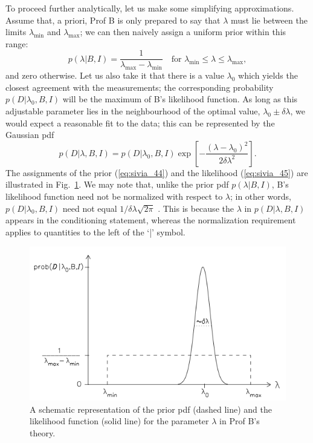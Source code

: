 \documentclass[%
oneside,                 %
final,                   %
10pt]{article}
\begin{document}
To proceed further analytically, let us make some simplifying approximations. Assume that, a priori, Prof B is only prepared to say that $\lambda$ must lie between the limits $\lambda_\mathrm{min}$ and $\lambda_\mathrm{max}$; we can then naively assign a uniform prior within this range:
\begin{equation}
p(\lambda|B,I) = \frac{1}{\lambda_\mathrm{max}-\lambda_\mathrm{min}} \quad \text{for } \lambda_\mathrm{min} \leq \lambda \leq \lambda_\mathrm{max}, 
\label{eq:sivia_44}
\end{equation}
and zero otherwise. Let us also take it that there is a value $\lambda_0$ which yields the closest agreement with the measurements; the corresponding probability $p(D|\lambda_0,B,I)$ will be the maximum of B’s likelihood function. As long as this adjustable parameter lies in the neighbourhood of the optimal value, $\lambda_0 \pm \delta\lambda$, we would expect a reasonable fit to the data; this can be represented by the Gaussian pdf
\begin{equation}
p(D|\lambda,B,I) = p(D|\lambda_0,B,I) \exp \left[ − \frac{(\lambda−\lambda_0)^2}{2\delta\lambda^2} \right]. 
\label{eq:sivia_45}
\end{equation}
The assignments of the prior (\ref{eq:sivia_44}) and the likelihood (\ref{eq:sivia_45}) are illustrated in Fig.~\ref{fig:sivia_41}. We may note that, unlike the prior pdf $p(\lambda|B,I)$, B’s likelihood function need not be normalized with respect to $\lambda$; in other words, $p(D|\lambda_0,B,I)$ need not equal $1/ \delta\lambda \sqrt{2\pi}$ . This is because the $\lambda$ in $p(D|\lambda,B,I)$ appears in the conditioning statement, whereas the normalization requirement applies to quantities to the left of the ‘|’ symbol.


\begin{figure}[!ht]  %
  \centerline{\includegraphics[width=0.8\linewidth]{fig/fig41.png}}
  \caption{
  A schematic representation of the prior pdf (dashed line) and the likelihood function (solid line) for the parameter $\lambda$ in Prof B’s theory. \label{fig:sivia_41}
  }
\end{figure}
\end{document}
